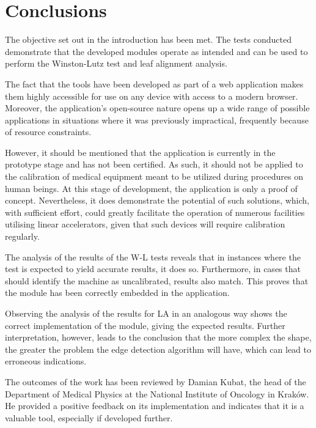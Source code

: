 \chapter{Conclusions} \label{chr:conclusions}

The objective set out in the introduction has been met. The tests conducted demonstrate that the developed modules operate as intended and can be used to perform the Winston-Lutz test and leaf alignment analysis.

The fact that the tools have been developed as part of a web application makes them highly accessible for use on any device with access to a modern browser. Moreover, the application's open-source nature opens up a wide range of possible applications in situations where it was previously impractical, frequently because of resource constraints.

However, it should be mentioned that the application is currently in the prototype stage and has not been certified. As such, it should not be applied to the calibration of medical equipment meant to be utilized during procedures on human beings. At this stage of development, the application is only a proof of concept. Nevertheless, it does demonstrate the potential of such solutions, which, with sufficient effort, could greatly facilitate the operation of numerous facilities utilising linear accelerators, given that such devices will require calibration regularly.

The analysis of the results of the W-L tests reveals that in instances where the test is expected to yield accurate results, it does so. Furthermore, in cases that should identify the machine as uncalibrated, results also match. This proves that the module has been correctly embedded in the application. 

Observing the analysis of the results for LA in an analogous way shows the correct implementation of the module, giving the expected results. Further interpretation, however, leads to the conclusion that the more complex the shape, the greater the problem the edge detection algorithm will have, which can lead to erroneous indications. 

The outcomes of the work has been reviewed by Damian Kubat, the head of the Department of Medical Physics at the National Institute of Oncology in Kraków. He provided a positive feedback on its implementation and indicates that it is a valuable tool, especially if developed further.
